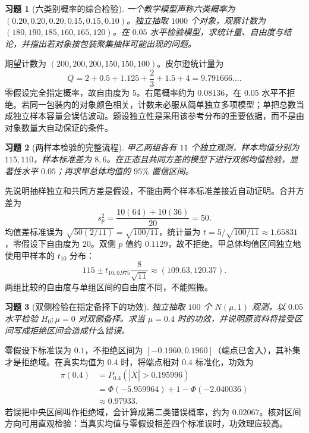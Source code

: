 \documentclass[UTF8,12pt,a4paper,fontset=fandol]{ctexart}
\newtheorem{exercise}{习题}[section]
\begin{document}
\begin{exercise}[六类别概率的综合检验]\label{q:M-F-8}
一个教学模型声称六类概率为 $(0.20,0.20,0.20,0.15,0.15,0.10)$。独立抽取 $1000$ 个对象，观察计数为 $(180,190,185,\allowbreak160,165,120)$。在 $0.05$ 水平检验模型，求统计量、自由度与结论，并指出若对象按包装聚集抽样可能出现的问题。\par{}
\end{exercise}

\begin{solve}\label{a:M-F-8}期望计数为 $(200,200,200,150,150,100)$。皮尔逊统计量为\[Q=2+0.5+1.125+\frac23+1.5+4=9.791666\ldots.\]零假设完全指定概率，故自由度为 $5$。右尾概率约为 $0.08136$，在 $0.05$ 水平不拒绝。若同一包装内的对象颜色相关，计数未必服从简单独立多项模型；单把总数当成独立样本容量会误估波动。题设独立性是采用该参考分布的重要依据，而不是由对象数量大自动保证的条件。\end{solve}

\begin{exercise}[两样本检验的完整流程]\label{q:M-F-9}
甲乙两组各有 $11$ 个独立观测，样本均值分别为 $115,110$，样本标准差为 $8,6$。在正态且共同方差的模型下进行双侧均值检验，显著性水平 $0.05$；再求甲总体均值的 $95\%$ 置信区间。\par{}
\end{exercise}

\begin{solve}\label{a:M-F-9}先说明抽样独立和共同方差是假设，不能由两个样本标准差接近自动证明。合并方差为\[s_p^2=\frac{10(64)+10(36)}{20}=50.\]均值差标准误为 $\sqrt{50(2/11)}=\sqrt{100/11}$，统计量为 $t=5/\sqrt{100/11}\approx1.65831$，零假设下自由度为 $20$。双侧 $p$ 值约 $0.1129$，故不拒绝。甲总体均值区间独立地使用甲样本的 $t_{10}$ 分布：\[115\pm t_{10;0.975}\frac8{\sqrt{11}}\approx(109.63,120.37).\]两组比较的自由度与单组区间的自由度不同，不能照搬。\end{solve}

\begin{exercise}[双侧检验在指定备择下的功效]\label{q:M-F-11}
独立抽取 $100$ 个 $N(\mu,1)$ 观测，以 $0.05$ 水平检验 $H_0:\mu=0$ 对双侧备择。求当 $\mu=0.4$ 时的功效，并说明原资料将接受区间写成拒绝区间会造成什么错误。\par{}
\end{exercise}

\begin{solve}\label{a:M-F-11}零假设下标准误为 $0.1$，不拒绝区间为 $[-0.1960,0.1960]$（端点已舍入），其补集才是拒绝域。在真实均值为 $0.4$ 时，将端点相对 $0.4$ 标准化，功效为\[\begin{aligned}\pi(0.4)&=P_{0.4}(|\overline X|>0.195996)\\&=\Phi(-5.959964)+1-\Phi(-2.040036)\\&\approx0.97933.\end{aligned}\]若误把中央区间叫作拒绝域，会计算成第二类错误概率，约为 $0.02067$。核对区间方向可用直观检验：当真实均值与零假设相差四个标准误时，功效理应较高。\end{solve}
\end{document}
